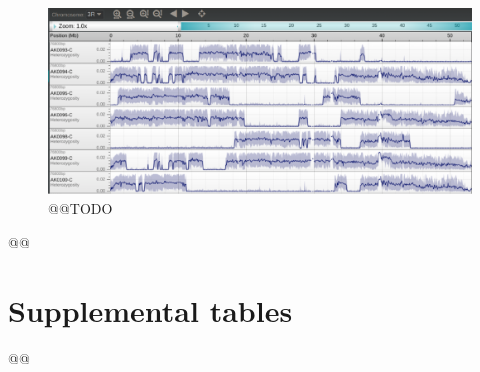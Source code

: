\documentclass[a4paper,11pt,abstracton,hidelinks]{scrartcl}
\begin{document}
\begin{figure}[h!]
\centering
\includegraphics[width=1\textwidth]{artwork/chapter4/keroh.pdf}
\caption{@@TODO
%
}
\label{fig:keroh}
\end{figure}



@@


\clearpage
\section{Supplemental tables}\label{sec:supplemental-tables}


@@
\end{document}
